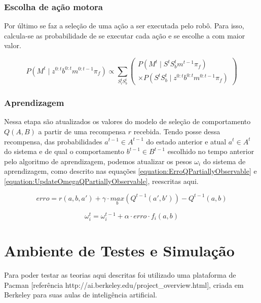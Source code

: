 \subsubsection{Escolha de ação motora}

Por último se faz a seleção de uma ação a ser executada pelo robô. Para isso, calcula-se as probabilidade de se executar cada ação e se escolhe a com maior valor.

\begin{equation}
    P \left( M^t \mid z^{0: t} b^{0: t} m^{0: t-1} \pi_f \right) \propto \sum\limits_{S_i^t S_b^t}
        \left(
            \begin{array}{l}
                P \left( M^t \mid S^t S_b^t m^{t-1} \pi_f \right)\\
                \times P \left( S^t S_b^t \mid z^{0: t} b^{0: t} m^{0: t-1} \pi_f \right)
            \end{array}
        \right)
\end{equation}


\subsubsection{Aprendizagem}

Nessa etapa são atualizados os valores do modelo de seleção de comportamento $ Q \left( A, B \right) $ a partir de uma recompensa $ r $ recebida. Tendo posse dessa recompensa, das probabilidades $ a^{t-1} \in A^{t-1} $ do estado anterior e atual $ a^t \in A^t $ do sistema e de qual o comportamento $ b^{t-1} \in B^{t-1} $ escolhido no tempo anterior pelo algoritmo de aprendizagem, podemos atualizar os pesos $ \omega_i $ do sistema de aprendizagem, como descrito nas equações \ref{equation:ErroQPartiallyObservable} e \ref{equation:UpdateOmegaQPartiallyObservable}, reescritas aqui.

$$
	erro = r \left( a, b, a' \right) + \gamma \cdot \underset{b}{max} \left( Q^{t-1} \left( a', b' \right) \right) - Q^{t-1} \left( a, b \right)
$$

$$
	\omega_i^t = \omega_i^{t-1} + \alpha \cdot erro \cdot f_i \left( a, b \right)
$$



\section{Ambiente de Testes e Simulação} \label{section:AmbienteDeTestes}

Para poder testar as teorias aqui descritas foi utilizado uma plataforma de Pacman [referência http://ai.berkeley.edu/project\_overview.html], criada em Berkeley para suas aulas de inteligência artificial.


